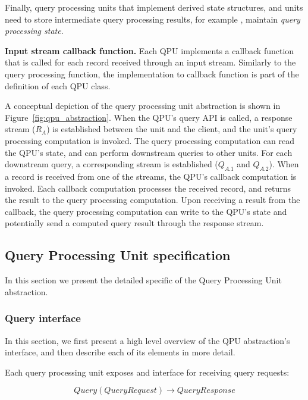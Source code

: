 Finally, query processing units that implement derived state structures, and units need to store intermediate query processing
results, for example , maintain \textit{query processing state}.

\medskip
\noindent
\textbf{Input stream callback function.}
Each QPU implements a callback function that is called for each record received through an input stream.
Similarly to the query processing function, the implementation to callback function is part of the definition of each
QPU class.

\bigskip

A conceptual depiction of the query processing unit abstraction is shown in Figure~\ref{fig:qpu_abstraction}.
When the QPU's query API is called, a response stream ($R_A$) is established between the unit and the client, and
the unit's query processing computation is invoked.
The query processing computation can read the QPU's state, and can perform downstream queries to other units.
For each downstream query, a corresponding stream is established ($Q_{A.1}$ and $Q_{A.2}$).
When a record is received from one of the streams, the QPU's callback computation is invoked.
Each callback computation processes the received record, and returns the result to the query processing computation.
Upon receiving a result from the callback, the query processing computation can write to the QPU's
state and potentially send a computed query result through the response stream.


\subsection{Query Processing Unit specification}
\label{ref:specification}

In this section we present the detailed specific of the Query Processing Unit abstraction.

\subsubsection{Query interface}

In this section, we first present a high level overview of the QPU abstraction's interface,
and then describe each of its elements in more detail.

Each query processing unit exposes and interface for receiving query requests:


\begin{displaymath}
  Query(QueryRequest) \rightarrow QueryResponse
\end{displaymath}

